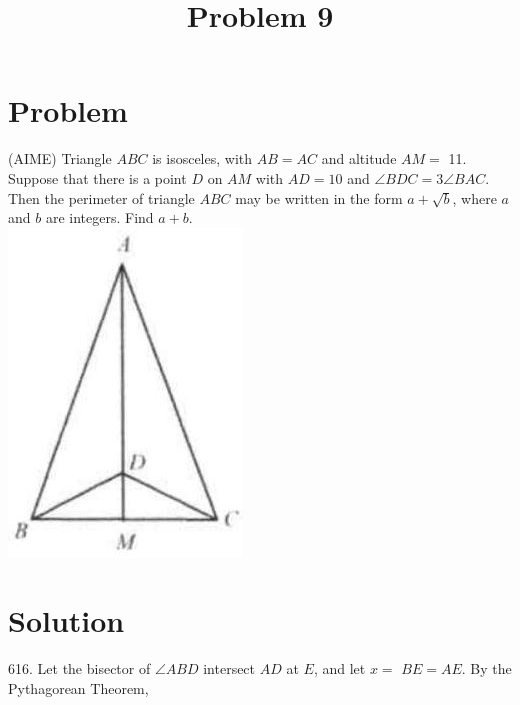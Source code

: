\documentclass{article}
\title{Problem 9}
\date{}
\begin{document}
\maketitle

\section*{Problem}
(AIME) Triangle \(A B C\) is isosceles, with \(A B=A C\) and altitude \(A M=\) 11. Suppose that there is a point \(D\) on \(A M\) with \(A D=10\) and \(\angle B D C=3 \angle B A C\). Then the perimeter of triangle \(A B C\) may be written in the form \(a+\sqrt{b}\), where \(a\) and \(b\) are integers. Find \(a+b\).\\
\centering
\includegraphics[width=\textwidth]{images/problem_image_1.jpg}

\section*{Solution}
616.
Let the bisector of \(\angle A B D\) intersect \(A D\) at \(E\), and let \(x=\) \(B E=A E\). By the Pythagorean Theorem,
\end{document}
